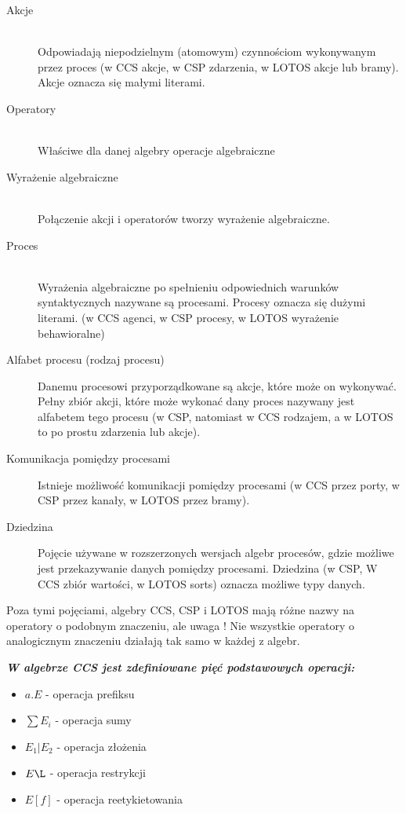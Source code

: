 \documentclass[a4paper,15pt]{article}
\begin{document}
\begin{description}

\item[Akcje] \hfill \\ 
Odpowiadają niepodzielnym (atomowym) czynnościom wykonywanym przez proces (w CCS akcje, w CSP zdarzenia, w LOTOS akcje lub bramy). Akcje oznacza się małymi literami.

\item[Operatory] \hfill \\ 
Właściwe dla danej algebry operacje algebraiczne

\item[Wyrażenie algebraiczne] \hfill \\ 
Połączenie akcji i operatorów tworzy wyrażenie algebraiczne. 

\item[Proces] \hfill \\ 
Wyrażenia algebraiczne po spełnieniu odpowiednich warunków syntaktycznych nazywane są procesami. Procesy oznacza się dużymi literami. (w CCS agenci, w CSP procesy, w LOTOS wyrażenie behawioralne)

\item[Alfabet procesu (rodzaj procesu)]
Danemu procesowi przyporządkowane są akcje, które może on wykonywać. Pełny zbiór akcji, które może wykonać dany proces nazywany jest alfabetem tego procesu (w CSP, natomiast w CCS rodzajem, a w LOTOS to po prostu zdarzenia lub akcje).

\item[Komunikacja pomiędzy procesami]
Istnieje możliwość komunikacji pomiędzy procesami (w CCS przez porty, w CSP przez kanały, w LOTOS przez bramy).

\item[Dziedzina]
Pojęcie używane w rozszerzonych wersjach algebr procesów, gdzie możliwe jest przekazywanie danych pomiędzy procesami. Dziedzina (w CSP, W CCS zbiór wartości, w LOTOS sorts) oznacza możliwe typy danych. 


\end{description}


Poza tymi pojęciami, algebry CCS, CSP i LOTOS mają różne nazwy na operatory o podobnym znaczeniu, ale uwaga ! Nie wszystkie operatory o analogicznym znaczeniu działają tak samo w każdej z algebr. 

\newpage

\textbf{\textit{W algebrze CCS jest zdefiniowane pięć podstawowych operacji:}}
\begin{itemize}
\item $a.E$ - operacja prefiksu
\item $\sum E_i $ - operacja sumy
\item $E_1|E_2$ - operacja złożenia
\item $E\L$ - operacja restrykcji
\item $E[f]$ - operacja reetykietowania
\end{itemize}
\end{document}
